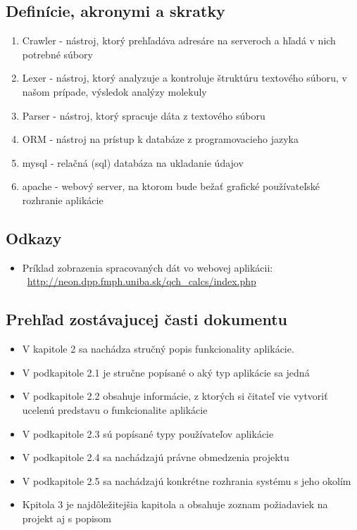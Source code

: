 \documentclass[12pt,a4paper, draft]{article}
\begin{document}
\subsection{Definície, akronymi a skratky}
\begin{enumerate}
	\item Crawler - nástroj, ktorý prehľadáva adresáre na serveroch a hľadá v nich potrebné súbory
	\item Lexer - nástroj, ktorý analyzuje a kontroluje štruktúru textového sú\-boru, v našom prípade, výsledok analýzy molekuly
	\item Parser - nástroj, ktorý spracuje dáta z textového súboru
	\item ORM - nástroj na prístup k databáze z programovacieho jazyka
	\item mysql - relačná (sql) databáza na ukladanie údajov
	\item apache - webový server, na ktorom bude bežať grafické používateľské rozhranie aplikácie
\end{enumerate}

\subsection{Odkazy}
\begin{itemize}
	\item Príklad zobrazenia spracovaných dát vo webovej aplikácii: \ \url{http://neon.dpp.fmph.uniba.sk/qch_calcs/index.php}
\end{itemize}

\subsection{Prehľad zostávajucej časti dokumentu}
\begin{itemize}
	\item V kapitole 2 sa nachádza stručný popis funkcionality aplikácie.
	\item V podkapitole 2.1 je stručne popísané o aký typ aplikácie sa jedná
	\item V podkapitole 2.2 obsahuje informácie, z ktorých si čitateľ vie vytvoriť ucelenú predstavu o funkcionalite aplikácie
	\item V podkapitole 2.3 sú popísané typy používateľov aplikácie
	\item V podkapitole 2.4 sa nachádzajú právne obmedzenia projektu
	\item V podkapitole 2.5 sa nachádzajú konkrétne rozhrania systému s jeho okolím
	\item Kpitola 3 je najdôležitejšia kapitola a obsahuje zoznam požiadaviek na projekt aj s popisom
\end{itemize}
\end{document}
